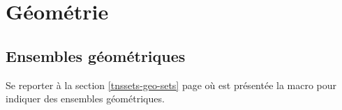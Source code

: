 \documentclass[12pt,a4paper]{article}
\begin{document}
\chapter{Géométrie}

\section{Ensembles géométriques}

Se reporter à la section \ref{tnssets-geo-sets} page \pageref{tnssets-geo-sets} où est présentée la macro  pour indiquer des ensembles géométriques.
\end{document}
